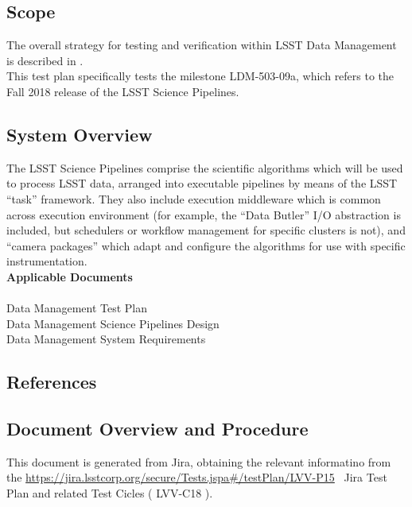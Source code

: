 \documentclass[DM,lsstdraft,STR,toc]{lsstdoc}
\begin{document}
\subsection{Scope}\label{scope}

The overall strategy for testing and verification within LSST Data
Management is described in .\\
This test plan specifically tests the milestone LDM-503-09a, which
refers to the Fall 2018 release of the LSST Science Pipelines.



\subsection{System Overview}
\label{sect:systemoverview}

The LSST Science Pipelines comprise the scientific algorithms which will
be used to process LSST data, arranged into executable pipelines by
means of the LSST ``task'' framework. They also include execution
middleware which is common across execution environment (for example,
the ``Data Butler'' I/O abstraction is included, but schedulers or
workflow management for specific clusters is not), and ``camera
packages'' which adapt and configure the algorithms for use with
specific instrumentation.\\[2\baselineskip]\textbf{Applicable
Documents\\
}\\
 Data Management Test Plan\\
 Data Management Science Pipelines Design\\
 Data Management System Requirements


\subsection{References}
\label{sect:references}
\renewcommand{\refname}{}


\subsection{Document Overview and Procedure}
\label{sect:docoverview}

This document is generated from Jira, obtaining the relevant informatino from the 
\url{https://jira.lsstcorp.org/secure/Tests.jspa#/testPlan/LVV-P15} 
~Jira Test Plan and related Test Cicles (
LVV-C18
).
\end{document}
